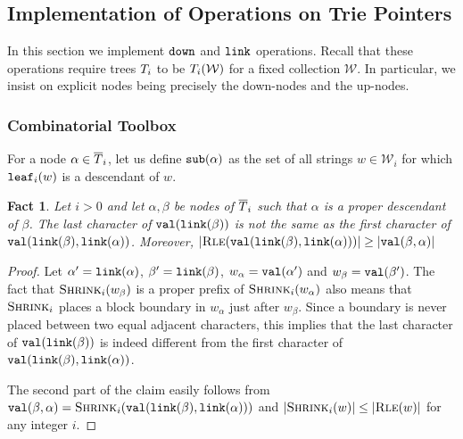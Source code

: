 \documentclass[a4paper]{article}
\newtheorem{fact}[theorem]{Fact}
\theoremstyle{remark}
\newcommand{\rle}{\textsc{Rle}}
\newcommand{\shrink}[1]{\ensuremath{\textsc{Shrink}_{#1}}}
\newcommand{\coll}{\mathcal{W}}
\begin{document}
\subsection{Implementation of Operations on Trie Pointers}\label{sec:triepointers}
In this section we implement $\mathtt{down}$ and $\mathtt{link}$ operations.
Recall that these operations require trees $T_i$ to be $\trie_i(\coll)$
for a fixed collection $\coll$.
In particular, we insist on explicit nodes being precisely the down-nodes and the up-nodes.

\subsubsection{Combinatorial Toolbox}


For a node $\alpha\in \overline{T}_i$, let us define $\mathtt{sub}(\alpha)$ as the set of all strings $w\in \coll_i$
for which $\mathtt{leaf}_i(w)$ is a descendant of $w$.

\begin{fact}\label{fct:link}
Let $i>0$ and let $\alpha,\beta$ be nodes of $\overline{T}_i$ such that $\alpha$
is a proper descendant of $\beta$.
The last character of $\mathtt{val}(\mathtt{link}(\beta))$ is not the same as the first character of $\mathtt{val}(\mathtt{link}(\beta),\mathtt{link}(\alpha))$.
Moreover, $|\rle(\tval(\tlink(\beta),\tlink(\alpha)))|\ge |\tval(\beta,\alpha)|$
\end{fact}
\begin{proof}
Let $\alpha'=\mathtt{link}(\alpha)$, $\beta'=\mathtt{link}(\beta)$, $w_{\alpha}=\mathtt{val}(\alpha')$
and $w_{\beta}=\mathtt{val}(\beta')$. The fact that $\shrink{i}(w_{\beta})$ is a proper prefix of $\shrink{i}(w_{\alpha})$
also means that $\shrink{i}$ places a block boundary in $w_{\alpha}$ just after $w_{\beta}$.
Since a boundary is never placed between two equal adjacent characters, this implies that the last character of $\mathtt{val}(\mathtt{link}(\beta))$
is indeed different from the first character of $\mathtt{val}(\mathtt{link}(\beta),\mathtt{link}(\alpha))$.

The second part of the claim easily follows from $\tval(\beta,\alpha)=\shrink{i}(\tval(\tlink(\beta),\tlink(\alpha)))$
and $|\shrink{i}(w)|\le |\rle(w)|$ for any integer $i$.
\end{proof}
\end{document}
